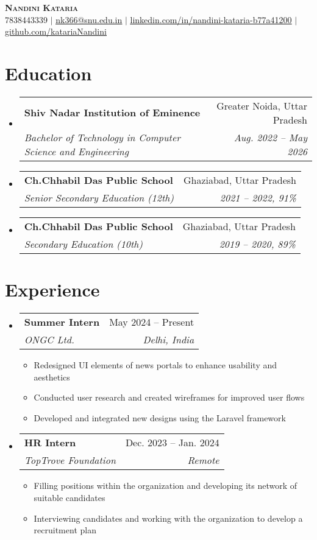 \documentclass[letterpaper,11pt]{article}
\makeatletter
\newcommand{\resumeItem}[1]{
  \item\small{
    {#1 \vspace{-2pt}}
  }
}
\newcommand{\resumeSubheading}[4]{
  \vspace{-2pt}\item
    \begin{tabular*}{0.97\textwidth}[t]{l@{\extracolsep{\fill}}r}
      \textbf{#1} & #2 \\
      \textit{\small#3} & \textit{\small #4} \\
    \end{tabular*}\vspace{-7pt}
}
\newcommand{\resumeSubHeadingListStart}{\begin{itemize}[leftmargin=0.15in, label={}]}
\newcommand{\resumeSubHeadingListEnd}{\end{itemize}}
\newcommand{\resumeItemListStart}{\begin{itemize}}
\newcommand{\resumeItemListEnd}{\end{itemize}\vspace{-5pt}}
\makeatother
\begin{document}
\begin{center}
    \textbf{\Huge \scshape Nandini Kataria} \\ \vspace{1pt}
    \small 7838443339 $|$ \href{mailto:nk366@snu.edu.in}{\underline{nk366@snu.edu.in}} $|$ 
    \href{https://www.linkedin.com/in/nandini-kataria-b77a41200/}{\underline{linkedin.com/in/nandini-kataria-b77a41200}} $|$
    \href{https://github.com/katariaNandini}{\underline{github.com/katariaNandini}}
\end{center}


\section{Education}
\resumeSubHeadingListStart
  \resumeSubheading
    {Shiv Nadar Institution of Eminence}{Greater Noida, Uttar Pradesh}
    {Bachelor of Technology in Computer Science and Engineering}{Aug. 2022 -- May 2026}
  \resumeSubheading
    {Ch.Chhabil Das Public School}{Ghaziabad, Uttar Pradesh}
    {Senior Secondary Education (12th)}{2021 -- 2022, 91\%}
  \resumeSubheading
    {Ch.Chhabil Das Public School}{Ghaziabad, Uttar Pradesh}
    {Secondary Education (10th)}{2019 -- 2020, 89\%}
\resumeSubHeadingListEnd



\section{Experience}
  \resumeSubHeadingListStart

    \resumeSubheading
      {Summer Intern}{May 2024 -- Present}
      {ONGC Ltd.}{Delhi, India}
      \resumeItemListStart
        \resumeItem{Redesigned UI elements of news portals to enhance usability and aesthetics}
        \resumeItem{Conducted user research and created wireframes for improved user flows}
        \resumeItem{Developed and integrated new designs using the Laravel framework}
      \resumeItemListEnd

    \resumeSubheading
      {HR Intern}{Dec. 2023 -- Jan. 2024}
      {TopTrove Foundation}{Remote}
      \resumeItemListStart
        \resumeItem{Filling positions within the organization and developing its network of suitable candidates}
        \resumeItem{Interviewing candidates and working with the organization to develop a recruitment plan}
      \resumeItemListEnd

  \resumeSubHeadingListEnd
\end{document}
